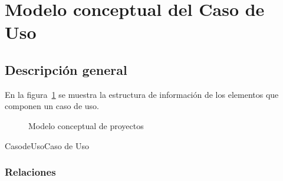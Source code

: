 \section{Modelo conceptual del Caso de Uso}

\subsection{Descripción general}
En la figura~\ref{fig:conceptualProyectos} se muestra la estructura de información de los elementos que componen un caso de uso.
 
\begin{figure}[htbp!]
	\begin{center}
		\caption{Modelo conceptual de proyectos}
		\label{fig:conceptualProyectos}
	\end{center}
\end{figure}



\begin{BusinessEntity}{CasodeUso}{Caso de Uso}
\end{BusinessEntity}

\subsubsection{Relaciones}

